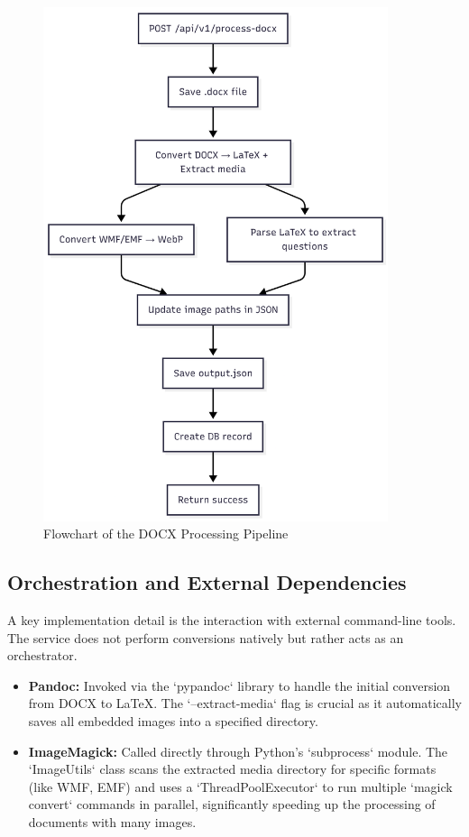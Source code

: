 \begin{figure}[htbp]
\centering
\includegraphics[width=0.9\textwidth]{figures/python-microservice-flow.png}
\caption{Flowchart of the DOCX Processing Pipeline}
\label{fig:python-microservice-flow}
\end{figure}

\FloatBarrier
\subsection{Orchestration and External Dependencies}
A key implementation detail is the interaction with external command-line tools. The service does not perform conversions natively but rather acts as an orchestrator.
\begin{itemize}
    \item \textbf{Pandoc:} Invoked via the `pypandoc` library to handle the initial conversion from DOCX to LaTeX. The `--extract-media` flag is crucial as it automatically saves all embedded images into a specified directory.
    \item \textbf{ImageMagick:} Called directly through Python's `subprocess` module. The `ImageUtils` class scans the extracted media directory for specific formats (like WMF, EMF) and uses a `ThreadPoolExecutor` to run multiple `magick convert` commands in parallel, significantly speeding up the processing of documents with many images.
\end{itemize}

